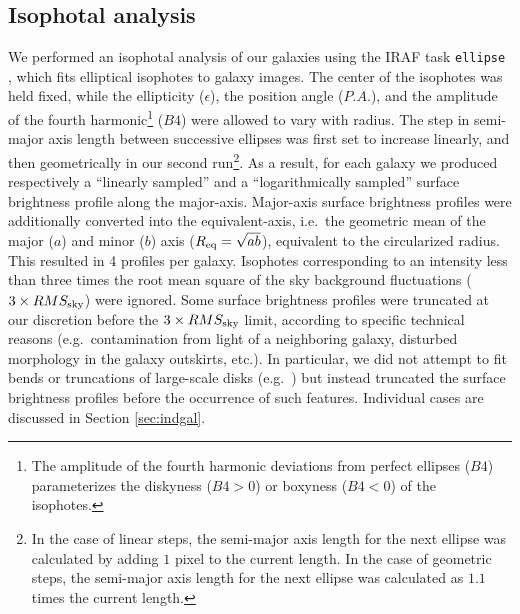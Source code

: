 \documentclass[preprint2]{emulateapj}
\begin{document}
\subsection{Isophotal analysis}
We performed an isophotal analysis of our galaxies using the IRAF task {\tt ellipse} \citep{taskellipse}, 
which fits elliptical isophotes to galaxy images.
The center of the isophotes was held fixed, while the ellipticity ($\epsilon$), the position angle ($P.A.$),  
and the amplitude of the fourth harmonic\footnote{The amplitude of the fourth harmonic deviations from perfect ellipses 
($B4$) parameterizes the diskyness ($B4>0$) or boxyness ($B4<0$) of the isophotes.} ($B4$) were allowed to vary with radius.
The step in semi-major axis length between successive ellipses was first set to increase linearly, 
and then geometrically in our second run\footnote{In the case of linear steps, 
the semi-major axis length for the next ellipse was calculated by adding $1$ pixel to the current length.
In the case of geometric steps, the semi-major axis length for the next ellipse 
was calculated as $1.1$ times the current length.}.
As a result, for each galaxy we produced respectively a ``linearly sampled'' and a ``logarithmically sampled'' 
surface brightness profile along the major-axis. 
Major-axis surface brightness profiles were additionally converted into the equivalent-axis,
i.e.~the geometric mean of the major ($a$) and minor ($b$) axis ($R_{\rm eq} = \sqrt{ab}$), 
equivalent to the circularized radius.
This resulted in 4 profiles per galaxy.
Isophotes corresponding to an intensity less than 
three times the root mean square of the sky background fluctuations ($3 \times RMS_{\rm sky}$) were ignored.
Some surface brightness profiles were truncated at our discretion before the $3 \times RMS_{\rm sky}$ limit, 
according to specific technical reasons (e.g.~contamination from light of a neighboring galaxy, 
disturbed morphology in the galaxy outskirts, etc.). 
In particular, we did not attempt to fit bends or truncations of large-scale disks 
(e.g.~\citealt{erwin2005,erwin2008,erwin2012,gutierrez2011,comeron2012,munozmateos2013,kim2014}) 
but instead truncated the surface brightness profiles before the occurrence of such features. 
Individual cases are discussed in Section \ref{sec:indgal}.
\end{document}
